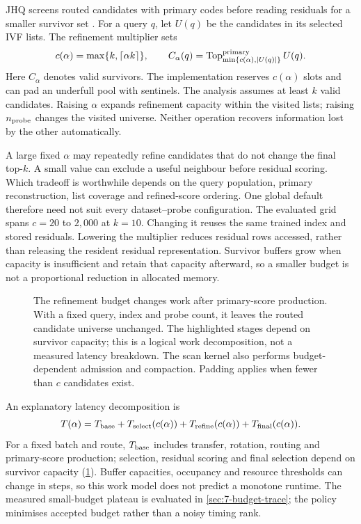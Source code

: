 JHQ screens routed candidates with primary codes before reading residuals
for a smaller survivor set \cite{jhq}. For a query $q$, let $U(q)$ be
the candidates in its selected IVF lists. The refinement multiplier sets
\begin{equation}
 c(\alpha)=\max\{k,\lceil\alpha k\rceil\},\qquad
 C_\alpha(q)=\operatorname{Top}^{\rm primary}_{\min\{c(\alpha),|U(q)|\}}U(q).
 \label{eq:6-budget}
\end{equation}
Here $C_\alpha$ denotes valid survivors. The implementation reserves
$c(\alpha)$ slots and can pad an underfull pool with sentinels. The
analysis assumes at least $k$ valid candidates. Raising $\alpha$ expands
refinement capacity within the visited lists; raising $n_{\rm probe}$
changes the visited universe. Neither operation recovers information
lost by the other automatically.

A large fixed $\alpha$ may repeatedly refine candidates that do not
change the final top-$k$. A small value can exclude a useful neighbour
before residual scoring. Which tradeoff is worthwhile depends on the
query population, primary reconstruction, list coverage and refined-score
ordering. One global default therefore need not suit every dataset--probe
configuration. The evaluated grid spans $c=20$ to $2{,}000$ at $k=10$.
Changing it reuses the same trained index and stored residuals.
Lowering the multiplier reduces residual rows accessed, rather than
releasing the resident residual representation. Survivor buffers grow
when capacity is insufficient and retain that capacity afterward, so a
smaller budget is not a proportional reduction in allocated memory.

\begin{figure}[tbp]
\centering

\caption[Work affected by the refinement budget]{The refinement budget changes work after primary-score
production. With a fixed query, index and probe count, it leaves the
routed candidate universe unchanged. The highlighted stages depend on
survivor capacity; this is a logical work decomposition, not a measured
latency breakdown. The scan kernel also performs budget-dependent
admission and compaction. Padding applies when fewer than $c$ candidates exist.}
\label{fig:6-budget-scope}
\end{figure}

An explanatory latency decomposition is
\begin{equation}
 T(\alpha)=T_{\rm base}+T_{\rm select}(c(\alpha))+
 T_{\rm refine}(c(\alpha))+T_{\rm final}(c(\alpha)).
 \label{eq:6-cost-model}
\end{equation}
For a fixed batch and route, $T_{\rm base}$ includes transfer, rotation,
routing and primary-score production; selection, residual scoring and
final selection depend on survivor capacity (\cref{fig:6-budget-scope}).
Buffer capacities, occupancy and resource thresholds can change in steps,
so this work model does not predict a monotone runtime. The measured
small-budget plateau is evaluated in \cref{sec:7-budget-trace}; the policy
minimises accepted budget rather than a noisy timing rank.


